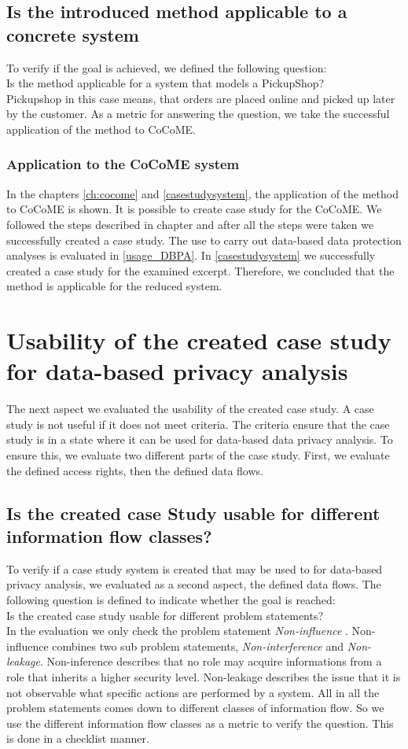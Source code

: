 \subsection{Is the introduced method applicable to a concrete system}
To verify if the goal is achieved, we defined the following question:\\
Is the method applicable for a system that models a PickupShop?\\
Pickupshop in this case means, that orders are placed online and picked up later by the customer.
As a metric for answering the question, we take the successful application of the method to CoCoME. 
\subsubsection{Application to the CoCoME system}
In the chapters \autoref{ch:cocome} and \autoref{casestudysystem}, the application of the method to CoCoME is shown. It is possible to create case study for the CoCoME. We followed the steps described in chapter  and after all the steps were taken we successfully created a case study. The use to carry out data-based data protection analyses is evaluated in  \autoref{usage_DBPA}. In \autoref{casestudysystem} we successfully created a case study for the examined excerpt. Therefore, we concluded that the method is applicable for the reduced system.
\section{Usability of the created case study for data-based privacy analysis}
\label{usage_DBPA}
The next aspect we evaluated the usability of the created case study. A case study is not useful if it does not meet criteria. The criteria ensure that the case study is in a state where it can be used for data-based data privacy analysis. To ensure this, we evaluate two different parts of the case study. First, we evaluate the defined access rights, then the defined data flows. 

\subsection{Is the created case Study usable for different information flow classes?}
To verify if a case study system is created that may be used to for data-based privacy analysis, we evaluated as a second aspect, the defined data flows. The following question is defined to indicate whether the goal is reached:\\
Is the created case study usable for different problem statements?\\
In the evaluation we only check the problem statement \textit{Non-influence} \cite{Noninfluence}. Non-influence combines two sub problem statements, \textit{Non-interference} and \textit{Non-leakage}. Non-inference describes that no role may acquire informations from a role that inherits a higher security level. Non-leakage describes the issue that it is not observable what specific actions are performed by a system. All in all the problem statements comes down to different classes of information flow. So we use the different information flow classes as a metric to verify the question. This is done in a checklist manner. 
